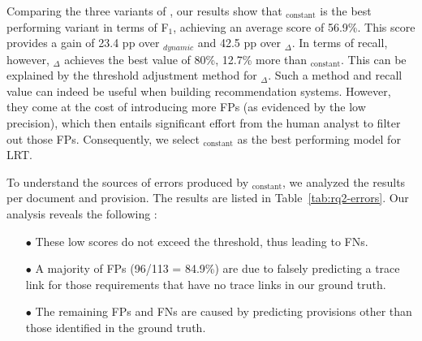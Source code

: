 Comparing the three variants of \kashif, our results show that \kashif$_{\text{constant}}$ is the best performing variant in terms of F$_1$, achieving an average score of 56.9\%. This score provides a gain of 23.4 pp over \kashif$_{dynamic}$ and 42.5 pp over \kashif$_{\Delta}$. In terms of recall, however, \kashif$_{\Delta}$ achieves the best value of 80\%, 12.7\% more than \kashif$_{\text{constant}}$. This can be explained by the threshold adjustment method for \kashif$_{\Delta}$. 
Such a method and recall value can indeed be useful when building recommendation systems. However, they come at the cost of introducing more FPs (as evidenced by the low precision), which then entails  significant effort from the human analyst to filter out those FPs. Consequently, we select  \kashif$_{\text{constant}}$ as the best performing model for LRT.    




To understand the sources of errors produced by \kashif$_{\text{constant}}$, we analyzed the results per document and provision. The results are listed in Table~\ref{tab:rq2-errors}. Our analysis reveals the following :


\begin{itemize}
    \item [$\bullet$]  %
    These low scores do not exceed the threshold, thus leading to FNs.  
    \item [$\bullet$]  A majority of FPs (96/113 = 84.9\%) are due to falsely predicting a trace link for those requirements that have no trace links in our ground truth. 
    \item [$\bullet$]  The remaining FPs and FNs are caused by predicting provisions other than those identified in the ground truth. 
\end{itemize}




